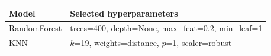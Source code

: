 \begin{tabular}{ll}
\toprule
Model & Selected hyperparameters \\
\midrule
RandomForest & trees=400, depth=None, max\_feat=0.2, min\_leaf=1 \\
KNN & $k$=19, weights=distance, $p$=1, scaler=robust \\
\bottomrule
\end{tabular}
